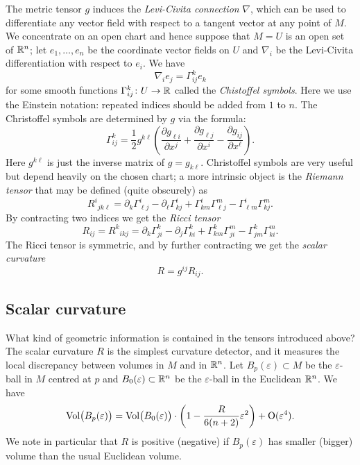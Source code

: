 The metric tensor $g$ induces the \emph{Levi-Civita connection} $\nabla$, which can be used to differentiate any vector field with respect to a tangent vector at any point of $M$. We concentrate on an open chart and hence suppose that $M=U$ is an open set of $\mathbb{R}^n$; let $e_1, \ldots, e_n$ be the coordinate vector fields on $U$ and $\nabla_i$ be the Levi-Civita differentiation with respect to $e_i$. We have
$$\nabla_i e_j = \Gamma^k_{ij} e_k$$
for some smooth functions $\Gamma^k_{ij} \colon U \to \mathbb{R}$ called the \emph{Chistoffel symbols}. Here we use the Einstein notation: repeated indices should be added from $1$ to $n$. The Christoffel symbols are determined by $g$ via the formula:
$$\Gamma_{ij}^k = \frac{1}{2}g^{k\ell} \left(\frac{\partial g_{\ell i}}{\partial x^j} + \frac{\partial g_{\ell j}}{\partial x^i} - \frac{\partial g_{ij}}{\partial x^\ell} \right).$$
Here $g^{k\ell}$ is just the inverse matrix of $g = g_{k\ell}$.
Christoffel symbols are very useful but depend heavily on the chosen chart; a more intrinsic object is the \emph{Riemann tensor} that may be defined (quite obscurely) as
$$R^i{}_{jk\ell} = \partial_k\Gamma^i_{\ell j}
    - \partial_\ell\Gamma^i_{k j}
    + \Gamma^i_{k m}\Gamma^m_{\ell j}
    - \Gamma^i_{\ell m}\Gamma^m_{k j}.$$ 
By contracting two indices we get the \emph{Ricci tensor} 
$$R_{ij} = {R^k}_{ik j} =
\partial_{k}{\Gamma^k_{ji}} - \partial_{j}\Gamma^k_{k i}
+ \Gamma^k_{km} \Gamma^m_{ji}
- \Gamma^k_{jm}\Gamma^m_{k i}.
$$ 
The Ricci tensor is symmetric, and by further contracting we get the \emph{scalar curvature}
$$R = g^{ij}R_{ij}.$$

\subsection{Scalar curvature} \label{gauss:subsection}
What kind of geometric information is contained in the tensors introduced above? The scalar curvature $R$ is the simplest curvature detector, and it measures the local discrepancy between volumes in $M$ and in $\mathbb{R}^n$. Let $B_p(\varepsilon)\subset M$ be the $\varepsilon$-ball in $M$ centred at $p$ and $B_0(\varepsilon)\subset \mathbb{R}^n$ be the $\varepsilon$-ball in the Euclidean $\mathbb{R}^n$. We have
$${\rm Vol}\big(B_p(\varepsilon)\big) = {\rm Vol}\big(B_0(\varepsilon)\big) \cdot \left( 1- \frac R{6(n+2)}\varepsilon^2 \right) + {\rm O}(\varepsilon^4).$$
We note in particular that $R$ is positive (negative) if $B_p(\varepsilon)$ has smaller (bigger) volume than the usual Euclidean volume.

